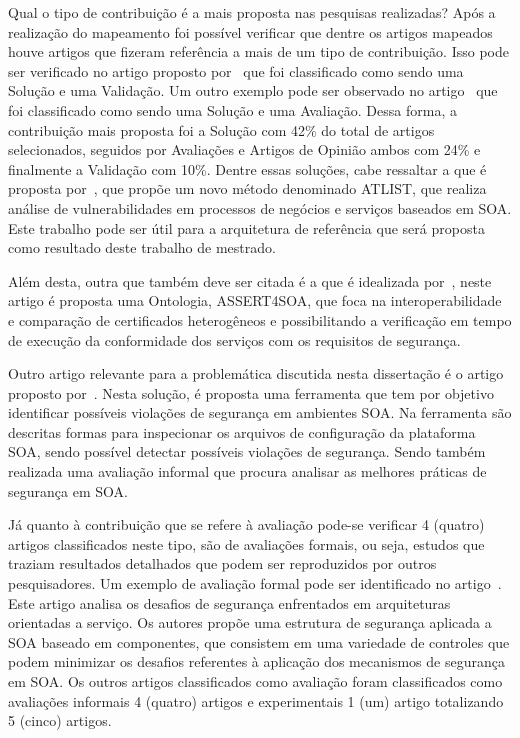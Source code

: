Qual o tipo de contribuição é a mais proposta nas pesquisas realizadas?
Após a realização do mapeamento foi possível verificar que dentre os artigos mapeados houve artigos que fizeram referência a mais de um tipo de contribuição. Isso pode ser verificado no artigo proposto por~\cite{Delegation_Solution2011} que foi classificado como sendo uma Solução e uma Validação. Um outro exemplo pode ser observado no artigo~\cite{Vulnerability_Analysis2011} que foi classificado como sendo uma Solução e uma Avaliação. Dessa forma, a contribuição mais proposta foi a Solução com 42\% do total de artigos selecionados, seguidos por Avaliações e Artigos de Opinião ambos com 24\% e finalmente a Validação com 10\%. Dentre essas soluções, cabe ressaltar a que é proposta por~\cite{Vulnerability_Analysis2011}, que propõe um novo método denominado ATLIST, que realiza análise de vulnerabilidades em processos de negócios e serviços baseados em SOA. Este trabalho pode ser útil para a arquitetura de referência que será proposta como resultado deste trabalho de mestrado.

Além desta, outra que também deve ser citada é a que é idealizada por~\cite{Ontology2012}, neste artigo é proposta uma Ontologia, ASSERT4SOA, que foca na interoperabilidade e comparação de certificados heterogêneos e possibilitando a verificação em tempo de execução da conformidade dos serviços com os requisitos de segurança.

Outro artigo relevante para a problemática discutida nesta dissertação é o artigo proposto por~\cite{WeberAM07}. Nesta solução, é proposta uma ferramenta que tem por objetivo identificar possíveis violações de segurança em ambientes SOA. Na ferramenta são descritas formas para inspecionar os arquivos de configuração da plataforma SOA, sendo possível detectar possíveis violações de segurança. Sendo também realizada uma avaliação informal que procura analisar as melhores práticas de segurança em SOA.

Já quanto à contribuição que se refere à avaliação pode-se verificar 4 (quatro) artigos classificados neste tipo, são de avaliações formais, ou seja, estudos que traziam resultados detalhados que podem ser reproduzidos por outros pesquisadores. Um exemplo de avaliação formal pode ser identificado no artigo~\cite{Coetzee2012}. Este artigo analisa os desafios de segurança enfrentados em arquiteturas orientadas a serviço. Os autores propõe uma estrutura de segurança aplicada a SOA baseado em componentes, que consistem em uma variedade de controles que podem minimizar os desafios referentes à aplicação dos mecanismos de segurança em SOA. Os outros artigos classificados como avaliação foram classificados como avaliações informais 4 (quatro) artigos e experimentais 1 (um) artigo totalizando 5 (cinco) artigos.

